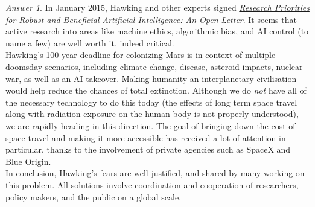 \documentclass[11pt]{article}
\theoremstyle{remark}
\newtheorem*{answer}{Answer}
\begin{document}
\begin{answer}
        In January 2015, Hawking and other experts signed
        \href{https://en.wikipedia.org/wiki/Open_Letter_on_Artificial_Intelligence}{
        \emph{Research Priorities for Robust and Beneficial Artificial Intelligence:
        An Open Letter}}. It seems that active research into areas like machine
        ethics, algorithmic bias, and AI control (to name a few) are well worth it,
        indeed critical. \\

        Hawking's 100 year deadline for colonizing Mars is in context of multiple
        doomsday scenarios, including climate change, disease, asteroid impacts,
        nuclear war, as well as an AI takeover. Making humanity an interplanetary
        civilisation would help reduce the chances of total extinction. Although we
        do \emph{not} have all of the necessary technology to do this today (the
        effects of long term space travel along with radiation exposure on the human
        body is not properly understood), we are rapidly heading in this direction.
        The goal of bringing down the cost of space travel and making it more
        accessible has received a lot of attention in particular, thanks to the
        involvement of private agencies such as SpaceX and Blue Origin. \\

        In conclusion, Hawking's fears are well justified, and shared by many working
        on this problem. All solutions involve coordination and cooperation of
        researchers, policy makers, and the public on a global scale.
        
    \end{answer}
\end{document}
